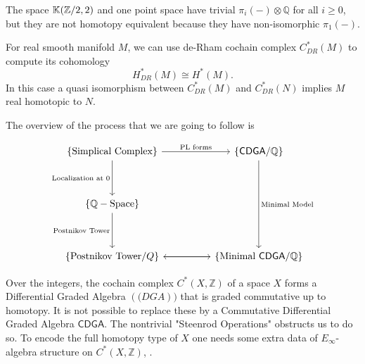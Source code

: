 \begin{example}
	The space \(\mathbb{K}(\mathbb Z/2, 2)\) and one point space have trivial \(\pi_i(-) \otimes \mathbb Q\) for all \(i \geq 0\), but they are not homotopy equivalent because they have non-isomorphic \(\pi_1(-)\).
\end{example}

For real smooth manifold \(M\), we can use de-Rham cochain complex \(C_{DR}^\ast(M)\) to compute its cohomology 
\[H_{DR}^\ast(M) \cong H^\ast(M).\]
In this case a quasi isomorphism between \(C^\ast_{DR}(M)\) and \(C^\ast_{DR}(N)\) implies \(M\) real homotopic to \(N\).
 
The overview of the process that we are going to follow is
\begin{center}
	\[\begin{tikzcd}
		{\{\text{Simplical Complex}\}} && {\{\CDGA\}} \\
		\\
		{\{\mathbb Q -\text{Space}\}} \\
		\\
		{\{\text{Postnikov Tower}/Q\}} && {\{\text{Minimal } \CDGA\}}
		\arrow["{\text{PL forms}}", from=1-1, to=1-3]
		\arrow["{\text{Localization at } 0}"', from=1-1, to=3-1]
		\arrow["{\text{Minimal Model}}", from=1-3, to=5-3]
		\arrow["{\text{Postnikov Tower}}"', from=3-1, to=5-1]
		\arrow[from=5-1, to=5-3]
		\arrow[from=5-3, to=5-1]
	\end{tikzcd}\]
\end{center}

Over the integers, the cochain complex \(C^\ast(X,\mathbb Z)\) of a space \(X\) forms a Differential Graded Algebra \((\mathsf(DGA))\) that is graded commutative up to homotopy.
It is not possible to replace these by a Commutative Differential Graded Algebra \(\mathsf{CDGA}\).
The nontrivial "Steenrod Operations" obstructs us to do so.
To encode the full homotopy type of \(X\) one needs some extra data of \(E_\infty\)-algebra structure on \(C^\ast(X,\mathbb Z)\), \cite{PMIHES_2006__103__213_0}.


